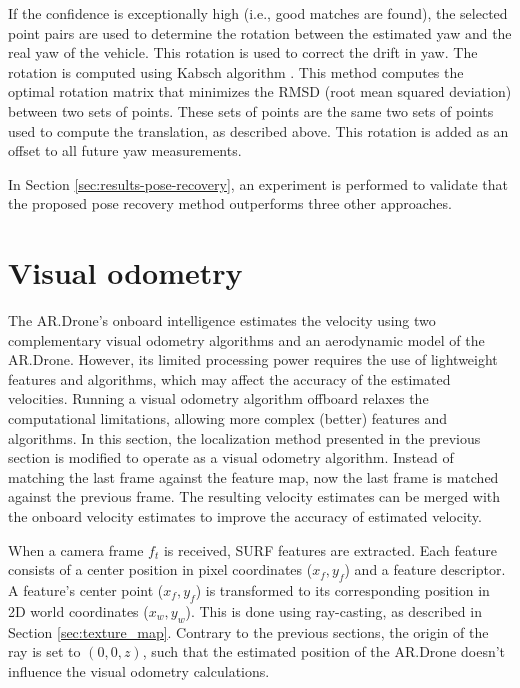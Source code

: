 If the confidence is exceptionally high (i.e., good matches are found), the selected point pairs are used to determine the rotation between the estimated yaw and the real yaw of the vehicle. This rotation is used to correct the drift in yaw.
The rotation is computed using Kabsch algorithm \cite{Kabsch:a12999}.
This method computes the optimal rotation matrix that minimizes the RMSD (root mean squared deviation) between two sets of points.
These sets of points are the same two sets of points used to compute the translation, as described above.
This rotation is added as an offset to all future yaw measurements.

In Section \ref{sec:results-pose-recovery}, an experiment is performed to validate that the proposed pose recovery method outperforms three other approaches.



\section{Visual odometry}
\label{sec:visual-slam-visual-odemetry}
The AR.Drone's onboard intelligence estimates the velocity using two complementary visual odometry algorithms and an aerodynamic model of the AR.Drone.
However, its limited processing power requires the use of lightweight features and algorithms, which may affect the accuracy of the estimated velocities.
Running a visual odometry algorithm offboard relaxes the computational limitations, allowing more complex (better) features and algorithms.
In this section, the localization method presented in the previous section is modified to operate as a visual odometry algorithm.
Instead of matching the last frame against the feature map, now the last frame is matched against the previous frame.
The resulting velocity estimates can be merged with the onboard velocity estimates to improve the accuracy of estimated velocity.

When a camera frame $f_t$ is received, SURF features are extracted.
Each feature consists of a center position in pixel coordinates ($x_f, y_f$) and a feature descriptor.
A feature's center point ($x_f, y_f$) is transformed to its corresponding position in 2D world coordinates ($x_w, y_w$).
This is done using ray-casting, as described in Section \ref{sec:texture_map}.
Contrary to the previous sections, the origin of the ray is set to $(0, 0, z)$, such that the estimated position of the AR.Drone doesn't influence the visual odometry calculations.

